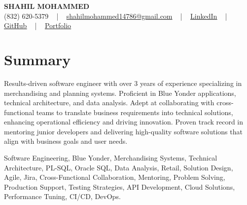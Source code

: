 \documentclass[letterpaper,10pt]{article}
\begin{document}
\begin{center}
    {\fontsize{14pt}{12pt}\selectfont \textbf{\MakeUppercase{Shahil Mohammed}}}\\ \vspace{2pt}
    \fontsize{10pt}{12pt}\selectfont (832) 620-5379 ~ | ~ \href{mailto:shahilmohammed14786@gmail.com}{shahilmohammed14786@gmail.com} ~ | ~  
    \href{https://www.linkedin.com/in/shahil-mohammed-9652931a1/}{\color{blue}\underline{LinkedIn}}  ~ | ~ 
    \href{https://github.com/freakbeast14}{\color{blue}\underline{GitHub}} ~ | ~ 
    \href{https://shahil-mohammed.netlify.app/}{\color{blue}\underline{Portfolio}}
    \vspace{-8pt}
\end{center}

\section{Summary}
\vspace{-2pt}\fontsize{8pt}{9pt}\selectfont
Results-driven software engineer with over 3 years of experience specializing in merchandising and planning systems. Proficient in Blue Yonder applications, technical architecture, and data analysis. Adept at collaborating with cross-functional teams to translate business requirements into technical solutions, enhancing operational efficiency and driving innovation. Proven track record in mentoring junior developers and delivering high-quality software solutions that align with business goals and user needs.
 \vspace{-5pt}
 
{\fontsize{1pt}{1pt}\selectfont\color{white}
Software Engineering, Blue Yonder, Merchandising Systems, Technical Architecture, PL-SQL, Oracle SQL, Data Analysis, Retail, Solution Design, Agile, Jira, Cross-Functional Collaboration, Mentoring, Problem Solving, Production Support, Testing Strategies, API Development, Cloud Solutions, Performance Tuning, CI/CD, DevOps.
}
\vspace{-8pt}

\vspace{-2pt}
\end{document}
